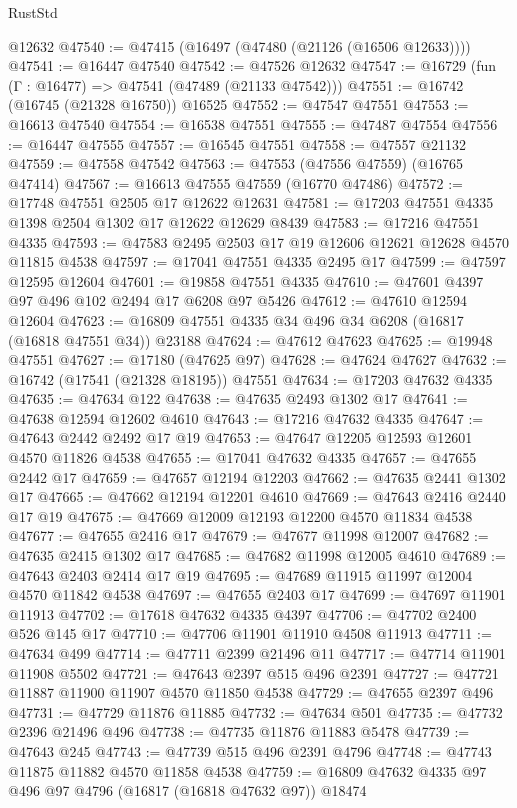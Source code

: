 \begin{lexlean}{RustStd}
\begin{coremodule}
{\begin{coremodule}
{{{{{{{{{{{{{{{{{{{{{{{{{{{{{{{{{{{{{{{{{{{{{{{{{{{{{{{    @12632
@47540 := @47415 (@16497 (@47480 (@21126 (@16506 @12633))))
@47541 := @16447 @47540
@47542 := @47526 @12632
@47547 := @16729 (fun (Γ : @16477) => @47541 (@47489 (@21133 @47542)))
@47551 := @16742 (@16745 (@21328 @16750)) @16525
@47552 := @47547 @47551
@47553 := @16613 @47540
@47554 := @16538 @47551
@47555 := @47487 @47554
@47556 := @16447 @47555
@47557 := @16545 @47551
@47558 := @47557 @21132
@47559 := @47558 @47542
@47563 := @47553 (@47556 @47559) (@16765 @47414)
@47567 := @16613 @47555 @47559 (@16770 @47486)
@47572 := @17748 @47551 @2505 @17 @12622 @12631
@47581 := @17203 @47551 @4335 @1398 @2504 @1302 @17 @12622 @12629 @8439
@47583 := @17216 @47551 @4335
@47593 := @47583 @2495 @2503 @17 @19 @12606 @12621 @12628 @4570 @11815 @4538
@47597 := @17041 @47551 @4335 @2495 @17
@47599 := @47597 @12595 @12604
@47601 := @19858 @47551 @4335
@47610 := @47601 @4397 @97 @496 @102 @2494 @17 @6208 @97 @5426
@47612 := @47610 @12594 @12604
@47623 := @16809 @47551 @4335 @34 @496 @34 @6208 (@16817 (@16818 @47551 @34)) @23188
@47624 := @47612 @47623
@47625 := @19948 @47551
@47627 := @17180 (@47625 @97)
@47628 := @47624 @47627
@47632 := @16742 (@17541 (@21328 @18195)) @47551
@47634 := @17203 @47632 @4335
@47635 := @47634 @122
@47638 := @47635 @2493 @1302 @17
@47641 := @47638 @12594 @12602 @4610
@47643 := @17216 @47632 @4335
@47647 := @47643 @2442 @2492 @17 @19
@47653 := @47647 @12205 @12593 @12601 @4570 @11826 @4538
@47655 := @17041 @47632 @4335
@47657 := @47655 @2442 @17
@47659 := @47657 @12194 @12203
@47662 := @47635 @2441 @1302 @17
@47665 := @47662 @12194 @12201 @4610
@47669 := @47643 @2416 @2440 @17 @19
@47675 := @47669 @12009 @12193 @12200 @4570 @11834 @4538
@47677 := @47655 @2416 @17
@47679 := @47677 @11998 @12007
@47682 := @47635 @2415 @1302 @17
@47685 := @47682 @11998 @12005 @4610
@47689 := @47643 @2403 @2414 @17 @19
@47695 := @47689 @11915 @11997 @12004 @4570 @11842 @4538
@47697 := @47655 @2403 @17
@47699 := @47697 @11901 @11913
@47702 := @17618 @47632 @4335 @4397
@47706 := @47702 @2400 @526 @145 @17
@47710 := @47706 @11901 @11910 @4508 @11913
@47711 := @47634 @499
@47714 := @47711 @2399 @21496 @11
@47717 := @47714 @11901 @11908 @5502
@47721 := @47643 @2397 @515 @496 @2391
@47727 := @47721 @11887 @11900 @11907 @4570 @11850 @4538
@47729 := @47655 @2397 @496
@47731 := @47729 @11876 @11885
@47732 := @47634 @501
@47735 := @47732 @2396 @21496 @496
@47738 := @47735 @11876 @11883 @5478
@47739 := @47643 @245
@47743 := @47739 @515 @496 @2391 @4796
@47748 := @47743 @11875 @11882 @4570 @11858 @4538
@47759 := @16809 @47632 @4335 @97 @496 @97 @4796 (@16817 (@16818 @47632 @97)) @18474
}}}}}}}}}}}}}}}}}}}}}}}}}}}}}}}}}}}}}}}}}}}}}}}}}}}}}}}
\end{coremodule}}
\end{coremodule}
\end{lexlean}
